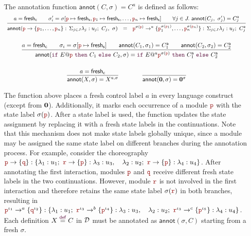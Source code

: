 \begin{definition}[Annotation]
  The annotation function $\mathsf{annot}(C,\sigma)=C^a$ is defined as
  follows:\\
  \[
    \begin{array}{c}\small
      \infer
      {
      \mathsf{annot}\!\left(
      \interact{\nr}{\nr_1,\ldots,\nr_n},\ \sigma
      \right)
      \ \ =\ \
      \interactl{\nr^{\sigma(\nr)}}a{\nr_1^{\sigma(\nr_1)},\ldots,\nr_n^{\sigma(\nr_n)}}
      }
      {
      a=\mathsf{fresh}_{\mathsf c}
      \qquad
      \sigma_i'=\sigma[
      \nr\mapsto\mathsf{fresh}_{\mathsf s},
      \nr_1\mapsto\mathsf{fresh}_{\mathsf s},\ldots,
      \nr_n\mapsto\mathsf{fresh}_{\mathsf s}]
      \qquad
      \forall j\in J.\ \mathsf{annot}(C_j,\ \sigma_j')=\anno {C}_j
      }
      \\[6mm]
      \infer
      {
      \mathsf{annot}(\ifTE{E}{\nr}{C_1}{C_2},\sigma)
      =
      \ifTEl{E}a{\nr^{\sigma(\nr)}}{\anno {C}_1}{\anno C_2}
      }
      {
      a=\mathsf{fresh}_{\mathsf c}
      \qquad
      \sigma_i=\sigma[\nr\mapsto\mathsf{fresh}_{\mathsf s}]
      \qquad
      \mathsf{annot}(C_1,\sigma_1)=\anno C_1
      \qquad
      \mathsf{annot}(C_2,\sigma_2)=\anno C_2
      }
      \\[6mm]
      \infer
      {
      \mathsf{annot}(X,\sigma)=X^{a,\sigma}
      }
      {
      a=\mathsf{fresh}_{\mathsf c}
      }
      \qquad\qquad
      \infer
      {
      \mathsf{annot}(\CEnd,\sigma)=\CEnd^{\sigma}
      }
      {
      }
\end{array}
\]
\end{definition}
The function above places a fresh control label $a$ in every language
construct (except from $\mathbf{0}$). Additionally, it marks each
occurrence of a module $\nr$ with the state label $\sigma(\nr)$. After
a state label is used, the function updates the state assignment by
replacing it with a fresh state labels in the continuations. Note that
this mechanism does not make state labels globally unique, since a
module may be assigned the same state label on different branches
during the annotation process.
%
For example, consider the choreography
% 
$
\interactBase{\nr}{\nrr} :
\{\lambda_1:u_1;\ \interactBase{\nrrr}{\nr}: \lambda_3:u_3,\quad
\lambda_2:u_2;\ \interactBase{\nrrr}{\nr}: \lambda_4:u_4\}
$.
% 
After annotating the first interaction, modules $\nr$ and $\nrr$
receive different fresh state labels in the two
continuations. However, module $\nrrr$ is not involved in the first
interaction and therefore retains the same state label $\sigma(\nrrr)$
in both branches, resulting in
% 
$
\interactBasel{\nr^{\iota_1}}a{\nrr^{\iota_2}} :
\{\lambda_1:u_1;\ \interactBasel{\nrrr^{\iota_3}}b{\nr^{\iota_4}}: \lambda_3:u_3,\quad
\lambda_2:u_2;\ \interactBasel{\nrrr^{\iota_3}}c{\nr^{\iota_5}}: \lambda_4:u_4\}
$.
% 
Each definition
$X\stackrel{\textcolor{sh_keyword}{\mathsf{def}}}{=} C$ in $\mathcal D$
must be annotated as $\mathsf{annot}(\sigma, C)$ starting from a fresh
$\sigma$.



